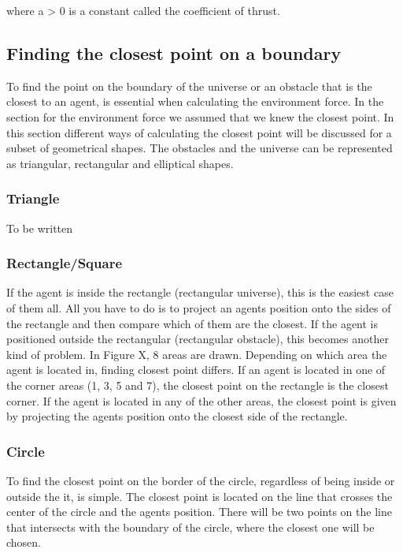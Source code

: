 \documentclass[paper=a4, fontsize=11pt,twoside]{scrartcl}		%
\begin{document}
\begin{flushleft}
where a > 0 is a constant called the coefficient of thrust.

\subsection{Finding the closest point on a boundary}

To find the point on the boundary of the universe or an obstacle that is the closest to an agent, is essential when calculating the environment force. In the section for the environment force we assumed that we knew the closest point. In this section different ways of calculating the closest point will be discussed for a subset of geometrical shapes. The obstacles and the universe can be represented as triangular, rectangular and elliptical shapes.

\subsubsection{Triangle}

To be written

\subsubsection{Rectangle/Square}

If the agent is inside the rectangle (rectangular universe), this is the easiest case of them all. All you have to do is to project an agents position onto the sides of the rectangle and then compare which of them are the closest. If the agent is positioned outside the rectangular (rectangular obstacle), this becomes another kind of problem. In Figure X, 8 areas are drawn. Depending on which area the agent is located in, finding closest point differs. If an agent is located in one of the corner areas (1, 3, 5 and 7), the closest point on the rectangle is the closest corner. If the agent is located in any of the other areas, the closest point is given by projecting the agents position onto the closest side of the rectangle.

\subsubsection{Circle}

To find the closest point on the border of the circle, regardless of being inside or outside the it, is simple. The closest point is located on the line that crosses the center of the circle and the agents position. There will be two points on the line that intersects with the boundary of the circle, where the closest one will be chosen.


\end{flushleft}
\end{document}
